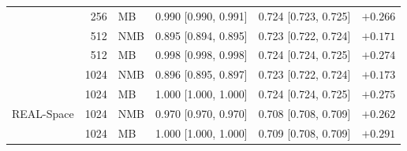 \begin{table}[htbp]
\begin{tabular}{@{}l r l r r r@{}}
     & 256 & MB & 0.990 [0.990, 0.991] & 0.724 [0.723, 0.725] & $+0.266$ \\
     & 512 & NMB & 0.895 [0.894, 0.895] & 0.723 [0.722, 0.724] & $+0.171$ \\
     & 512 & MB & 0.998 [0.998, 0.998] & 0.724 [0.724, 0.725] & $+0.274$ \\
     & 1024 & NMB & 0.896 [0.895, 0.897] & 0.723 [0.722, 0.724] & $+0.173$ \\
     & 1024 & MB & 1.000 [1.000, 1.000] & 0.724 [0.724, 0.725] & $+0.275$ \\
    \addlinespace
    REAL-Space & 1024 & NMB & 0.970 [0.970, 0.970] & 0.708 [0.708, 0.709] & $+0.262$ \\
     & 1024 & MB & 1.000 [1.000, 1.000] & 0.709 [0.708, 0.709] & $+0.291$ \\
    \bottomrule
  \end{tabular}
\end{table}
